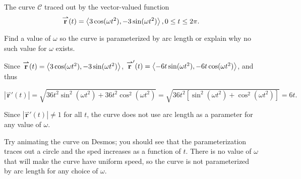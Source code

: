 \documentclass[noauthor,handout]{ximera}
\newcommand{\Magd}[2]{\left| \vec{#1}'\left(#2\right) \right|}
\renewcommand{\vec}[1]{{\overset{\boldsymbol{\rightharpoonup}}{\mathbf{#1}}}}
\begin{document}

\begin{problem}
The curve $\mathcal{C}$ traced out by the vector-valued function \[ \vec{r}(t) = \vector{3\cos(\omega t^2), -3\sin(\omega t^2)}, 0 \leq t \leq 2\pi. \]

Find a value of $\omega$ so the curve is parameterized by arc length or explain why no such value for $\omega$ exists.

\begin{freeResponse}
Since $\vec{r}(t) = \vector{3\cos(\omega t^2), -3\sin(\omega t^2)}$, $\vec{r}'(t) = \vector{-6t \sin(\omega t^2), -6t\cos(\omega t^2)}$, and thus

\[
\Magd{r}{t} = \sqrt{36t^2\sin^2(\omega t^2) + 36t^2 \cos^2(\omega t^2)} = \sqrt{36t^2\left[\sin^2(\omega t^2) + \cos^2(\omega t^2)\right]} = 6t.
\]

Since $\Magd{r}{t} \neq 1$ for all $t$, the curve does not use arc length as a parameter for any value of $\omega$.

\begin{remark}
Try animating the curve on Desmos; you should see that the parameterization traces out a circle and the sped increases as a function of $t$.  There is no value of $\omega$ that will make the curve have uniform speed, so the curve is not parameterized by arc length for any choice of $\omega$.
\end{remark}
\end{freeResponse}
\end{problem}

\end{document}
